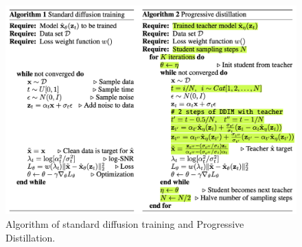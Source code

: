 \documentclass[10pt,twocolumn,letterpaper]{article}
\begin{document}
\begin{figure}[t]
    \includegraphics[width=\linewidth]{assets/algorithm.png}
    \caption{\label{fig:algorithm}Algorithm of standard diffusion training and Progressive Distillation.}
\end{figure}



{\small


}
\end{document}
